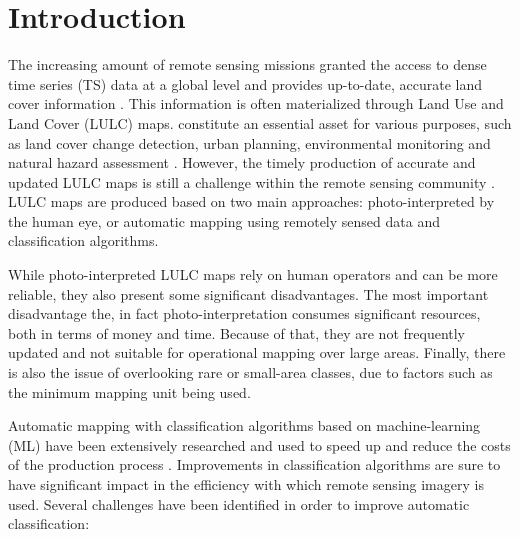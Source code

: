 \documentclass[remotesensing,article,submit,moreauthors,pdftex]{Definitions/mdpi}
\begin{document}
\section{Introduction}

The increasing amount of remote sensing missions granted the access to dense
time series (TS) data at a global level and provides up-to-date, accurate land
cover information \cite{Drusch2012}. This information is often materialized
through Land Use and Land Cover (LULC) maps.  constitute an essential asset for various purposes, such as land cover
change detection, urban planning, environmental monitoring and natural hazard
assessment \cite{Khatami2016}. However, the timely production of accurate and
updated LULC maps is still a challenge within the remote sensing community
\cite{Wulder2018}. LULC maps are produced based on two main approaches:
photo-interpreted by the human eye, or automatic mapping using remotely sensed
data and classification algorithms.

While photo-interpreted LULC maps rely on human operators and can be more
reliable, they also present some significant disadvantages. The most important
disadvantage the, in fact photo-interpretation consumes significant resources, both in
terms of money and time. Because of that, they are not frequently updated and
not suitable for operational mapping over large areas.  Finally, there is also
the issue of overlooking rare or small-area classes, due to factors such as
the minimum mapping unit being used.

Automatic mapping with classification algorithms based on machine-learning
(ML) have been extensively researched and used to speed up and reduce the
costs of the production process . Improvements in classification algorithms are sure to have
significant impact in the efficiency with which remote sensing imagery is
used. Several challenges have been identified in order to improve automatic
classification:
\end{document}
